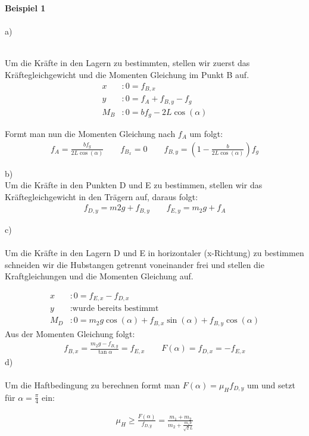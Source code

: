 %
\noindent
\textbf{Beispiel 1} \\ \\
a) 
	\begin{figure}[h]
		\centering
		
	\end{figure} \\
Um die Kräfte in den Lagern zu bestimmten, stellen wir zuerst das Kräftegleichgewicht und die Momenten Gleichung im Punkt B auf. 
\begin{align*}\label{key}
x&: 0=f_{B,x} \\
y&: 0 = f_A + f_{B,y} -f_g\\
M_B&:0=b f_g-2L \cos(\alpha)  
\end{align*}

\noindent
Formt man nun die Momenten Gleichung nach \(f_A\) um folgt: 
\begin{align*}
f_A = \frac{b f_g}{2L \cos(\alpha)} \qquad f_{B_x}=0 \qquad f_{B,y} = \left(1-\frac{b}{2L \cos(\alpha)}\right) f_g
\end{align*}
\begin{figure}[h]
	\centering
	
\end{figure}
b) \\
Um die Kräfte in den Punkten D und E zu bestimmen, stellen wir das Kräftegleichgewicht in den Trägern auf, daraus folgt: 
\begin{align*}
 f_{D,y} = m2 g + f_{B,y}\qquad	f_{E,y} = m_2 g + f_A 
\end{align*}

\begin{figure}[h]
	\centering
	
\end{figure}
\newpage
\noindent
c)\\  \\ %
Um die Kräfte in den Lagern D und E in horizontaler (x-Richtung) zu bestimmen schneiden wir die Hubstangen getrennt voneinander frei und stellen die Kraftgleichungen und die Momenten Gleichung auf. 

\begin{align*}
	x&:  0 = f_{E,x} - f_{D,x}\\
	y&:  \text{wurde bereits bestimmt} \\ 
	M_D&: 0 = m_2 g \cos(\alpha) +f_{B,x} \sin(\alpha) + f_{B,y} \cos(\alpha)
\end{align*}
Aus der Momenten Gleichung  folgt: 
\begin{align*}
	f_{B,x} = \frac{m_2 g- f_{B,y}}{\tan{\alpha}} =f_{E,x} \qquad  F(\alpha) = f_{D,x} = -f_{E,x}
\end{align*}
\noindent 
d) \\ \\ 	
	Um die Haftbedingung zu berechnen formt man \(F(\alpha) = \mu_H f_{D,y}\) um und setzt für \(\alpha=\frac{\pi}{4}\) ein: 
	
	\begin{align*}
		\mu_H \geq \frac{F(\alpha)}{f_{D,y}} = \frac{m_1+m_2}{m_2+\frac{m_1 b}{\sqrt2L}}
	\end{align*}
	
%